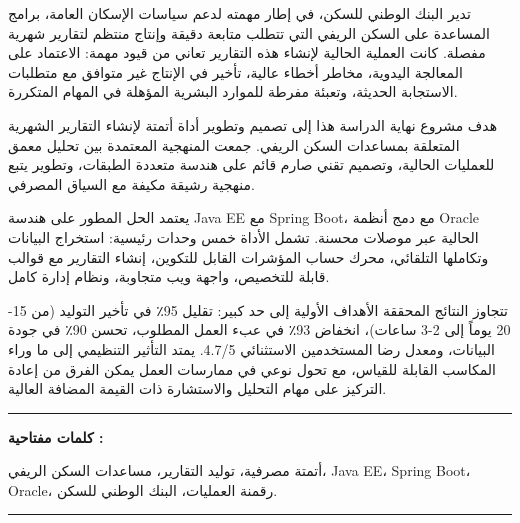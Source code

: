 \begin{Arabic}
\end{Arabic}

\begin{Arabic}
    تدير البنك الوطني للسكن، في إطار مهمته لدعم سياسات الإسكان العامة، برامج المساعدة على السكن الريفي التي تتطلب متابعة دقيقة وإنتاج منتظم لتقارير شهرية مفصلة. كانت العملية الحالية لإنشاء هذه التقارير تعاني من قيود مهمة: الاعتماد على المعالجة اليدوية، مخاطر أخطاء عالية، تأخير في الإنتاج غير متوافق مع متطلبات الاستجابة الحديثة، وتعبئة مفرطة للموارد البشرية المؤهلة في المهام المتكررة.
\end{Arabic}

\medskip

\begin{Arabic}
    هدف مشروع نهاية الدراسة هذا إلى تصميم وتطوير أداة أتمتة لإنشاء التقارير الشهرية المتعلقة بمساعدات السكن الريفي. جمعت المنهجية المعتمدة بين تحليل معمق للعمليات الحالية، وتصميم تقني صارم قائم على هندسة متعددة الطبقات، وتطوير يتبع منهجية رشيقة مكيفة مع السياق المصرفي.
\end{Arabic}

\medskip

\begin{Arabic}
    يعتمد الحل المطور على هندسة Java EE مع Spring Boot، مع دمج أنظمة Oracle الحالية عبر موصلات محسنة. تشمل الأداة خمس وحدات رئيسية: استخراج البيانات وتكاملها التلقائي، محرك حساب المؤشرات القابل للتكوين، إنشاء التقارير مع قوالب قابلة للتخصيص، واجهة ويب متجاوبة، ونظام إدارة كامل.
\end{Arabic}

\medskip

\begin{Arabic}
    تتجاوز النتائج المحققة الأهداف الأولية إلى حد كبير: تقليل 95٪ في تأخير التوليد (من 15-20 يوماً إلى 2-3 ساعات)، انخفاض 93٪ في عبء العمل المطلوب، تحسن 90٪ في جودة البيانات، ومعدل رضا المستخدمين الاستثنائي 4.7/5. يمتد التأثير التنظيمي إلى ما وراء المكاسب القابلة للقياس، مع تحول نوعي في ممارسات العمل يمكن الفرق من إعادة التركيز على مهام التحليل والاستشارة ذات القيمة المضافة العالية.
\end{Arabic}

\vspace{3cm}

\noindent\rule[2pt]{\textwidth}{0.5pt}

\begin{Arabic}
    \textbf{كلمات مفتاحية :}

    أتمتة مصرفية، توليد التقارير، مساعدات السكن الريفي، Java EE، Spring Boot، Oracle، رقمنة العمليات، البنك الوطني للسكن.

\end{Arabic}

\noindent\rule[2pt]{\textwidth}{0.5pt}